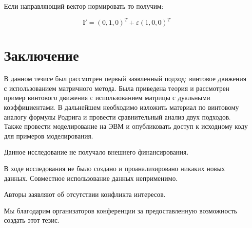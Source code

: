 \documentclass[%
]{ittmm}
\begin{document}
Если направляющий вектор нормировать то получим:

\begin{equation*}
  \mathbf{l}' = (0,1,0)^T + \varepsilon (1,0,0)^T
\end{equation*}


\section{Заключение}
В данном тезисе был рассмотрен первый заявленный подход: винтовое движения с использованием матричного метода. 
Была приведена теория и рассмотрен пример винтового движения с использованием матрицы с дуальными коэффициентами. 
В дальнейшем необходимо изложить материал по винтовому аналогу формулы Родрига и провести сравнительный анализ 
двух подходов. Также провести моделирование на ЭВМ и опубликовать доступ к исходному коду для примеров моделирования. 


\vspace{\baselineskip}


\begin{funding}
  Данное исследование не получало внешнего финансирования.
\end{funding}

\begin{dataavailability}
  В ходе исследования не было создано и проанализировано никаких новых данных. Совместное использование данных неприменимо.
\end{dataavailability}

\begin{conflictsofinterest}
  Авторы заявляют об отсутствии конфликта интересов.
\end{conflictsofinterest}

\begin{acknowledgments}
  Мы благодарим организаторов конференции за предоставленную возможность создать этот тезис.
\end{acknowledgments}

\printbibliography
\end{document}
